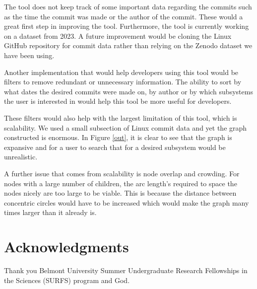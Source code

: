 \documentclass[conference]{IEEEtran}
\begin{document}
The tool does not keep track of some important data regarding the commits such as the time the commit was made or the author of the commit. These would a great first step in improving the tool. Furthermore, the tool is currently working on a dataset from 2023. A future improvement would be cloning the Linux GitHub repository for commit data rather than relying on the Zenodo dataset \cite{zenodo} we have been using.

Another implementation that would help developers using this tool would be filters to remove redundant or unnecessary information. The ability to sort by what dates the desired commits were made on, by author or by which subsystems the user is interested in would help this tool be more useful for developers. 

These filters would also help with the largest limitation of this tool, which is scalability. We used a small subsection of Linux commit data and yet the graph constructed is enormous. In Figure \ref{out}, it is clear to see that the graph is expansive and for a user to search that for a desired subsystem would be unrealistic. 

A further issue that comes from scalability is node overlap and crowding. For nodes with a large number of children, the arc length's required to space the nodes nicely are too large to be viable. This is because the distance between concentric circles would have to be increased which would make the graph many times larger than it already is.




\section*{Acknowledgments}
Thank you Belmont University Summer Undergraduate Research Fellowships in the Sciences (SURFS) program and God.







\vspace{12pt}
\end{document}
